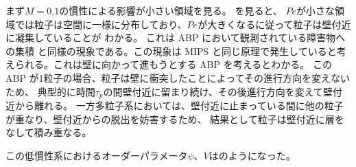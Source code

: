 \documentclass[/Users/ikedahajime/GitHub/reserch/master_report/thesis]{subfiles}
\begin{document}
まず$M=0.1$の慣性による影響が小さい領域を見る。 を見ると、
$Pe$が小さな領域では粒子は空間に一様に分布しており、$Pe$が大きくなるに従って粒子は壁付近に凝集していることが
わかる。
これは ABP において観測されている障害物への集積\cite{yangAggregationSegregationConfined2014}
と同様の現象である。この現象は MIPS\cite{filyAthermalPhaseSeparation2012}
と同じ原理で発生していると考えられる。これは壁に向かって進もうとする ABP を考えるとわかる。
この ABP が1粒子の場合、粒子は壁に衝突したことによってその進行方向を変えないため、
典型的に時間$\tau_p$の間壁付近に留まり続け、その後進行方向を変えて壁付近から離れる。
一方多粒子系においては、壁付近に止まっている間に他の粒子が重なり、壁付近からの脱出を妨害するため、
結果として粒子は壁付近に層をなして積み重なる。%

この低慣性系におけるオーダーパラメータ$\psi、V$はのようになった。
\end{document}
